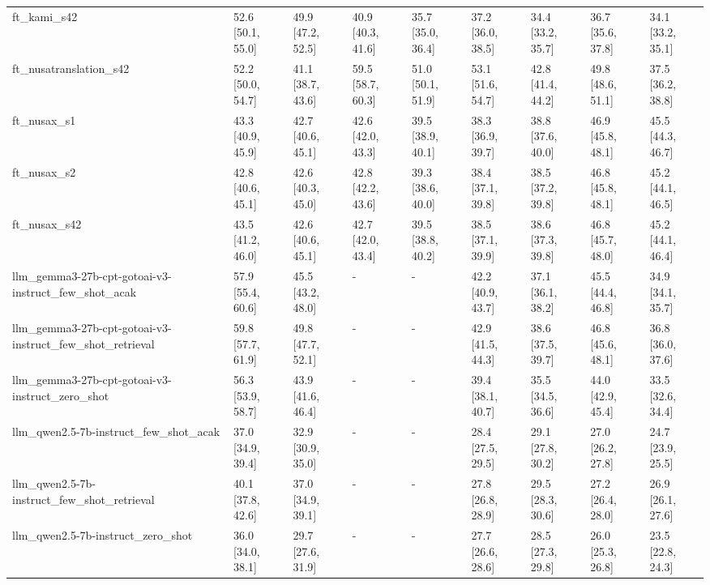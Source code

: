 \begin{tabular}{lllllllll}
ft\_kami\_s42 & 52.6 [50.1, 55.0] & 49.9 [47.2, 52.5] & 40.9 [40.3, 41.6] & 35.7 [35.0, 36.4] & 37.2 [36.0, 38.5] & 34.4 [33.2, 35.7] & 36.7 [35.6, 37.8] & 34.1 [33.2, 35.1] \\
ft\_nusatranslation\_s42 & 52.2 [50.0, 54.7] & 41.1 [38.7, 43.6] & 59.5 [58.7, 60.3] & 51.0 [50.1, 51.9] & 53.1 [51.6, 54.7] & 42.8 [41.4, 44.2] & 49.8 [48.6, 51.1] & 37.5 [36.2, 38.8] \\
ft\_nusax\_s1 & 43.3 [40.9, 45.9] & 42.7 [40.6, 45.1] & 42.6 [42.0, 43.3] & 39.5 [38.9, 40.1] & 38.3 [36.9, 39.7] & 38.8 [37.6, 40.0] & 46.9 [45.8, 48.1] & 45.5 [44.3, 46.7] \\
ft\_nusax\_s2 & 42.8 [40.6, 45.1] & 42.6 [40.3, 45.0] & 42.8 [42.2, 43.6] & 39.3 [38.6, 40.0] & 38.4 [37.1, 39.8] & 38.5 [37.2, 39.8] & 46.8 [45.8, 48.1] & 45.2 [44.1, 46.5] \\
ft\_nusax\_s42 & 43.5 [41.2, 46.0] & 42.6 [40.6, 45.1] & 42.7 [42.0, 43.4] & 39.5 [38.8, 40.2] & 38.5 [37.1, 39.9] & 38.6 [37.3, 39.8] & 46.8 [45.7, 48.0] & 45.2 [44.1, 46.4] \\
llm\_gemma3-27b-cpt-gotoai-v3-instruct\_few\_shot\_acak & 57.9 [55.4, 60.6] & 45.5 [43.2, 48.0] & - & - & 42.2 [40.9, 43.7] & 37.1 [36.1, 38.2] & 45.5 [44.4, 46.8] & 34.9 [34.1, 35.7] \\
llm\_gemma3-27b-cpt-gotoai-v3-instruct\_few\_shot\_retrieval & 59.8 [57.7, 61.9] & 49.8 [47.7, 52.1] & - & - & 42.9 [41.5, 44.3] & 38.6 [37.5, 39.7] & 46.8 [45.6, 48.1] & 36.8 [36.0, 37.6] \\
llm\_gemma3-27b-cpt-gotoai-v3-instruct\_zero\_shot & 56.3 [53.9, 58.7] & 43.9 [41.6, 46.4] & - & - & 39.4 [38.1, 40.7] & 35.5 [34.5, 36.6] & 44.0 [42.9, 45.4] & 33.5 [32.6, 34.4] \\
llm\_qwen2.5-7b-instruct\_few\_shot\_acak & 37.0 [34.9, 39.4] & 32.9 [30.9, 35.0] & - & - & 28.4 [27.5, 29.5] & 29.1 [27.8, 30.2] & 27.0 [26.2, 27.8] & 24.7 [23.9, 25.5] \\
llm\_qwen2.5-7b-instruct\_few\_shot\_retrieval & 40.1 [37.8, 42.6] & 37.0 [34.9, 39.1] & - & - & 27.8 [26.8, 28.9] & 29.5 [28.3, 30.6] & 27.2 [26.4, 28.0] & 26.9 [26.1, 27.6] \\
llm\_qwen2.5-7b-instruct\_zero\_shot & 36.0 [34.0, 38.1] & 29.7 [27.6, 31.9] & - & - & 27.7 [26.6, 28.6] & 28.5 [27.3, 29.8] & 26.0 [25.3, 26.8] & 23.5 [22.8, 24.3] \\
\bottomrule
\end{tabular}
